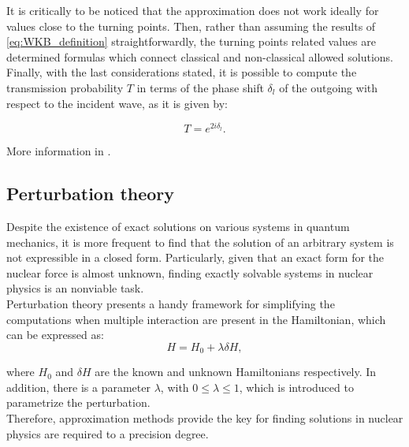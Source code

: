 \documentclass[openany]{book}
\begin{document}
It is critically to be noticed that the approximation does not work ideally for values close to the turning points. Then, rather than assuming the results of \ref{eq:WKB_definition} straightforwardly, the turning points related values are determined formulas which connect classical and non-classical allowed solutions. \\

Finally, with the last considerations stated, it is possible to compute the transmission probability $T$ in terms of the phase shift $\delta_l$ of the outgoing with respect to the incident wave, as it  is given by: 
 
\begin{equation} \label{eq:tunneling_transmissionProbability}
	T = e^{2i\delta_l}.
\end{equation}

More information in \cite{newton_2002}.

\subsection{Perturbation theory}\label{sub:perturbationTheory}

Despite the existence of exact solutions on various systems in quantum mechanics, it is more frequent to find that the solution of an arbitrary system is not expressible in a closed form. Particularly, given that an exact form for the nuclear force is almost unknown, finding exactly solvable systems in nuclear physics is an nonviable task. \\

Perturbation theory presents a handy framework for simplifying the computations when multiple interaction are present in the Hamiltonian, which can be expressed as: \\

\begin{equation} \label{eq:perturbationTheory_hamiltonian}
	H = H_0 + \lambda \delta H,
\end{equation}

where $H_0$ and $\delta H$ are the known and unknown Hamiltonians respectively. In addition, there is a parameter $\lambda$, with $0 \le \lambda \le 1$, which is introduced to parametrize the perturbation. \\

Therefore, approximation methods provide the key for finding solutions in nuclear physics are required to a precision degree. \\
\end{document}

